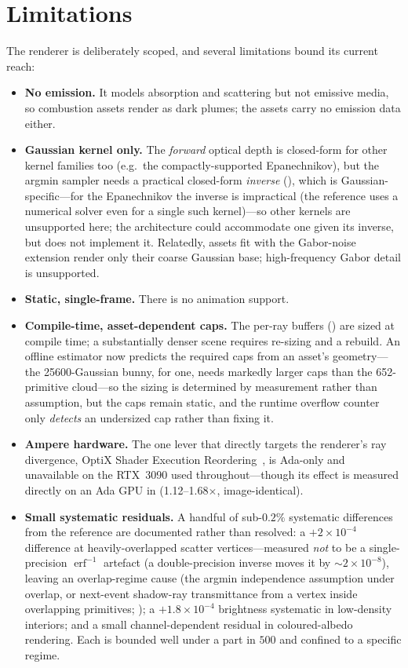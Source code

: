 \section{Limitations}
\label{sec:limitations}

The renderer is deliberately scoped, and several limitations bound its current reach:

\begin{itemize}
  \item \textbf{No emission.} It models absorption and scattering but not emissive media, so combustion
  assets render as dark plumes; the assets carry no emission data either.
  \item \textbf{Gaussian kernel only.} The \emph{forward} optical depth is closed-form for other kernel
  families too (e.g.\ the compactly-supported Epanechnikov), but the argmin sampler needs a practical
  closed-form \emph{inverse} (), which is Gaussian-specific---for the Epanechnikov
  the inverse is impractical (the reference uses a numerical solver even for a single such kernel)---so
  other kernels are unsupported here; the architecture could accommodate one given its inverse, but does
  not implement it. Relatedly, assets fit with the Gabor-noise extension render only their coarse
  Gaussian base; high-frequency Gabor detail is unsupported.
  \item \textbf{Static, single-frame.} There is no animation support.
  \item \textbf{Compile-time, asset-dependent caps.} The per-ray buffers () are sized
  at compile time; a substantially denser scene requires re-sizing and a rebuild. An offline estimator
  now predicts the required caps from an asset's geometry---the \num{25600}-Gaussian bunny, for one,
  needs markedly larger caps than the \num{652}-primitive cloud---so the sizing is determined by
  measurement rather than assumption, but the caps remain static, and the runtime overflow counter only
  \emph{detects} an undersized cap rather than fixing it.
  \item \textbf{Ampere hardware.} The one lever that directly targets the renderer's ray divergence,
  OptiX Shader Execution Reordering~\cite{NvidiaSER2022}, is Ada-only and unavailable on the RTX~3090
  used throughout---though its effect is measured directly on an Ada GPU in 
  (\num{1.12}--\num{1.68}$\times$, image-identical).
  \item \textbf{Small systematic residuals.} A handful of sub-$0.2\%$ systematic differences from the
  reference are documented rather than resolved: a ${+}2\times10^{-4}$ difference at heavily-overlapped
  scatter vertices---measured \emph{not} to be a single-precision $\operatorname{erf}^{-1}$ artefact (a
  double-precision inverse moves it by ${\sim}2\times10^{-8}$), leaving an overlap-regime cause (the
  argmin independence assumption under overlap, or next-event shadow-ray transmittance from a vertex
  inside overlapping primitives; ); a ${+}1.8\times10^{-4}$ brightness systematic in low-density interiors; and a
  small channel-dependent residual in coloured-albedo rendering. Each is bounded well under a part in
  $500$ and confined to a specific regime.
\end{itemize}

